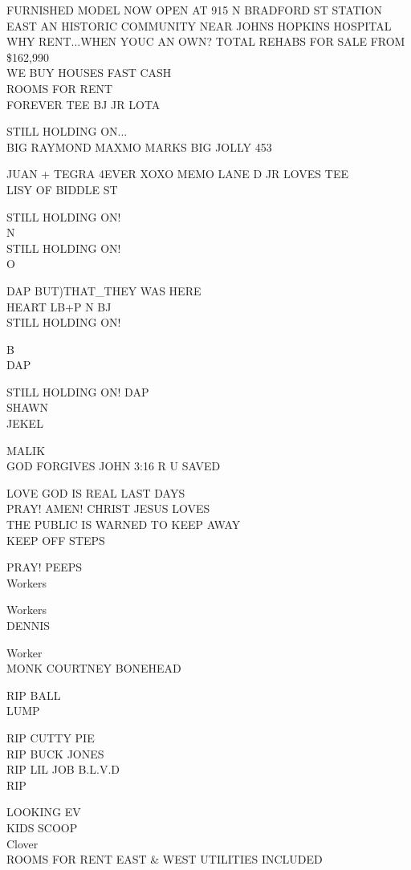 \documentclass[10pt,letterpaper]{article}
\begin{document}
FURNISHED MODEL NOW OPEN AT 915 N BRADFORD ST STATION EAST AN HISTORIC COMMUNITY NEAR JOHNS HOPKINS HOSPITAL WHY RENT...WHEN YOUC AN OWN?  TOTAL REHABS FOR SALE FROM \$162,990\\
WE BUY HOUSES FAST CASH\\
ROOMS FOR RENT\\
FOREVER TEE BJ JR LOTA

STILL HOLDING ON...\\
BIG RAYMOND MAXMO MARKS BIG JOLLY 453

JUAN + TEGRA 4EVER XOXO MEMO LANE D JR LOVES TEE\\
LISY OF BIDDLE ST

STILL HOLDING ON!\\
N\\
STILL HOLDING ON!\\
O

DAP BUT)THAT\_THEY WAS HERE\\
HEART LB+P N BJ\\
STILL HOLDING ON!

B\\
DAP

STILL HOLDING ON!  DAP\\
SHAWN\\
JEKEL

MALIK\\
GOD FORGIVES JOHN 3:16 R U SAVED

LOVE GOD IS REAL LAST DAYS\\
PRAY!  AMEN!  CHRIST JESUS LOVES\\
THE PUBLIC IS WARNED TO KEEP AWAY\\
KEEP OFF STEPS

PRAY!  PEEPS\\
Workers

Workers\\
DENNIS

Worker\\
MONK COURTNEY BONEHEAD

RIP BALL\\
LUMP

RIP CUTTY PIE\\
RIP BUCK JONES\\
RIP LIL JOB B.L.V.D\\
RIP

LOOKING EV\\
KIDS SCOOP\\
Clover\\
ROOMS FOR RENT EAST \& WEST UTILITIES INCLUDED
\end{document}
